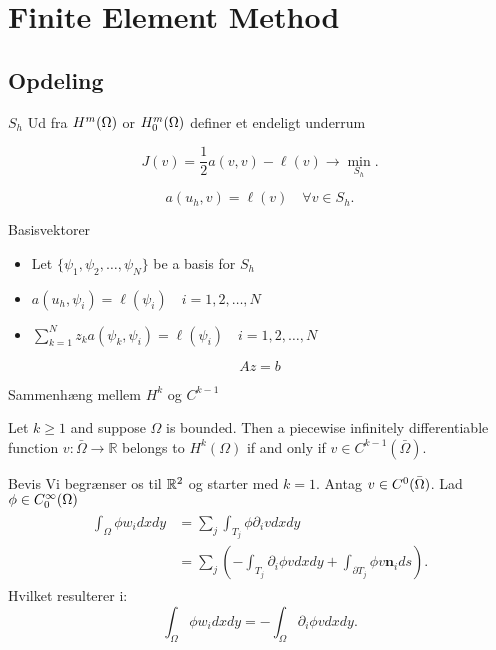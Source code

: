 
\section{Finite Element Method}
\subsection{Opdeling}
\begin{frame}{$S_h$}{}
    Ud fra $H^m(\Omega)$ or $H^m_0(\Omega)$ definer et endeligt underrum

\begin{equation*}
    J(v) = \frac{1}{2}a(v,v) - \ell(v) \to \underset{S_h}{\min}.
\end{equation*}

\begin{equation*}
    a(u_h,v) = \ell(v) \quad \forall v \in S_h.
\end{equation*}
\end{frame}
\begin{frame}{Basisvektorer}
   \begin{itemize}
    \item Let $ \{ \psi_1, \psi_2, \ldots, \psi_N \}$ be a basis for $S_h$ 
    \item $ a(u_h, \psi_i) = \ell(\psi_i) \quad i = 1, 2, \ldots, N $ 
    \item $\sum_{k=1}^N z_k a(\psi_k,\psi_i) = \ell(\psi_i) \quad i = 1,2,\ldots,N $
   \end{itemize} 
   \begin{equation*}
    Az = b
   \end{equation*}
\end{frame}
\begin{frame}{Sammenhæng mellem $H^k$ og $C^{k-1}$}
   \begin{theorem}
    Let $k\geq1$ and suppose $\Omega$ is bounded. Then a piecewise infinitely differentiable function $v:\bar{\Omega}\rightarrow \mathbb{R}$
    belongs to $H^k(\Omega)$ if and only if $v\in C^{k-1}(\bar{\Omega})$.
   \end{theorem} 
\end{frame}
\begin{frame}{Bevis}
    Vi begrænser os til $\mathbb{R}^2$ og starter med $k=1$. Antag $v\in C^0(\bar{\Omega})$. 
    Lad $\phi \in C^\infty_0(\Omega)$
    \begin{align}
    \begin{split}
    \int_\Omega \phi w_i dxdy &= \sum_j\int_{T_j} \phi \partial_i v dx dy \\
        &= \sum_j \left( -\int_{T_j} \partial_i \phi v dxdy + \int_{\partial T_j} \phi v \mathbf{n}_i ds\right).
    \end{split}
    \end{align}
    Hvilket resulterer i:
    \begin{equation}
        \int_\Omega \phi w_i dxdy = -\int_\Omega \partial_i \phi v dxdy.
    \end{equation}
\end{frame}

